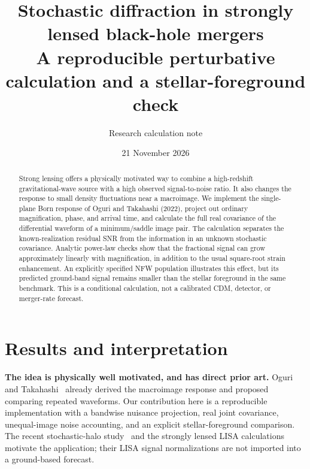 \documentclass[11pt]{article}
\title{Stochastic diffraction in strongly lensed black-hole mergers\\[0.4em]
\large A reproducible perturbative calculation and a stellar-foreground check}
\author{Research calculation note}
\date{21 November 2026}
\begin{document}
\maketitle
\begin{abstract}
Strong lensing offers a physically motivated way to combine a high-redshift
gravitational-wave source with a high observed signal-to-noise ratio. It also
changes the response to small density fluctuations near a macroimage. We
implement the single-plane Born response of Oguri and Takahashi (2022), project
out ordinary magnification, phase, and arrival time, and calculate the full real
covariance of the differential waveform of a minimum/saddle image pair. The
calculation separates the known-realization residual SNR from the information
in an unknown stochastic covariance. Analytic power-law checks show that the
fractional signal can grow approximately linearly with magnification, in
addition to the usual square-root strain enhancement. An explicitly specified
NFW population illustrates this effect, but its predicted ground-band signal
remains smaller than the stellar foreground in the same benchmark. This is a
conditional calculation, not a calibrated CDM, detector, or merger-rate forecast.
\end{abstract}

\section{Results and interpretation}

\textbf{The idea is physically well motivated, and has direct prior art.}
Oguri and Takahashi~\cite{oguri2022} already derived the macroimage response
and proposed comparing repeated waveforms. Our contribution here is a
reproducible implementation with a bandwise nuisance projection, real joint
covariance, unequal-image noise accounting, and an explicit stellar-foreground
comparison. The recent stochastic-halo study~\cite{choi2026} and the strongly
lensed LISA calculations~\cite{ando2026a,ando2026b} motivate the application;
their LISA signal normalizations are not imported into a ground-based forecast.
\end{document}
